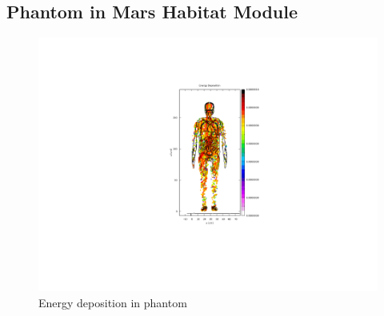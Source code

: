
\subsection{Phantom in Mars Habitat Module}



\begin{figure}
 \begin{centering}
 \centering
 \includegraphics[width=\paperwidth]{../figs/phantom_ed.png}
 \caption{Energy deposition in phantom}
 \label{fig:results_fig}
 \end{centering}
\end{figure}
